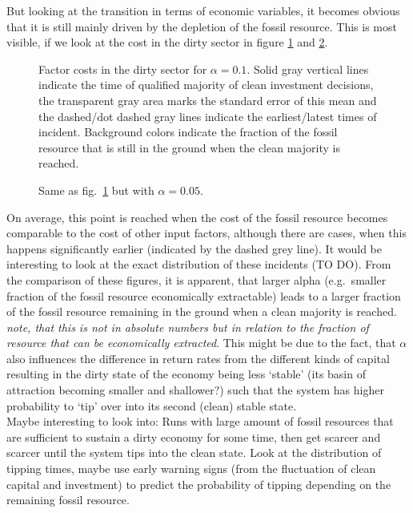 But looking at the transition in terms of economic variables, it becomes obvious that it is still mainly driven by the depletion of the fossil resource. This is most visible, if we look at the cost in the dirty sector in figure \ref{fig:learning_dirty_cost0o1} and \ref{fig:learning_dirty_cost0o05}.

\begin{figure}[t]
	\centering
	\caption{Factor costs in the dirty sector for $\alpha = 0.1$. Solid gray vertical lines indicate the time of qualified majority of clean investment decisions, the transparent gray area marks the standard error of this mean and the dashed/dot dashed gray lines indicate the earliest/latest times of incident. Background colors indicate the fraction of the fossil resource that is still in the ground when the clean majority is reached.}
	\label{fig:learning_dirty_cost0o1}
\end{figure}
\begin{figure}[t]
	\centering
	\caption{Same as fig.~\ref{fig:learning_dirty_cost0o1} but with $\alpha = 0.05$.}
	\label{fig:learning_dirty_cost0o05}
\end{figure}
On average, this point is reached when the cost of the fossil resource becomes comparable to the cost of other input factors, although there are cases, when this happens  significantly earlier (indicated by the dashed grey line). It would be interesting to look at the exact distribution of these incidents (TO DO).
From the comparison of these figures, it is apparent, that larger alpha (e.g.\ smaller fraction of the fossil resource economically extractable) leads to a larger fraction of the fossil resource remaining in the ground when a clean majority is reached. \textit{note, that this is not in absolute numbers but in relation to the fraction of resource that can be economically extracted}.
This might be due to the fact, that $\alpha$ also influences the difference in return rates from the different kinds of capital resulting in the dirty state of the economy being less `stable' (its basin of attraction becoming smaller and shallower?) such that the system has higher probability to `tip' over into its second (clean) stable state. \\

Maybe interesting to look into: Runs with large amount of fossil resources that are sufficient to sustain a dirty economy for some time, then get scarcer and scarcer until the system tips into the clean state. Look at the distribution of tipping times, maybe use early warning signs (from the fluctuation of clean capital and investment) to predict the probability of tipping depending on the remaining fossil resource.

